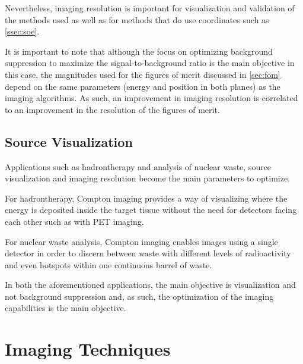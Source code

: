 Nevertheless, imaging resolution is important for visualization and validation of the methods used as well as for methods that do use coordinates such as \ref{ssec:soe}.

It is important to note that although the focus on optimizing background suppression to maximize the signal-to-background ratio is the main objective in this case, the magnitudes used for the figures of merit discussed in \ref{sec:fom} depend on the same parameters (energy and position in both planes) as the imaging algorithms. As such, an improvement in imaging resolution is correlated to an improvement in the resolution of the figures of merit.

\section{Source Visualization}

Applications such as hadrontherapy and analysis of nuclear waste, source visualization and imaging resolution become the main parameters to optimize.

For hadrontherapy, Compton imaging provides a way of visualizing where the energy is deposited inside the target tissue without the need for detectors facing each other such as with PET imaging.

For nuclear waste analysis, Compton imaging enables images using a single detector in order to discern between waste with different levels of radioactivity and even hotspots within one continuous barrel of waste.

In both the aforementioned applications, the main objective is visualization and not background suppression and, as such, the optimization of the imaging capabilities is the main objective.

\chapter{Imaging Techniques}\label{ch:techniques}

